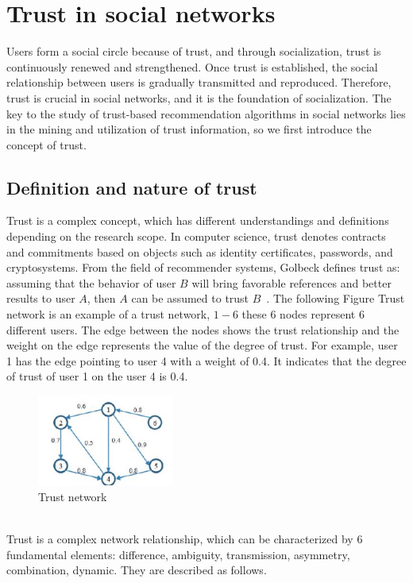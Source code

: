 \section{Trust in social networks}

Users form a social circle because of trust, and through socialization, trust is 
continuously renewed and strengthened. Once trust is established, the social relationship 
between users is gradually transmitted and reproduced\cite{b25, b27}. Therefore, trust is crucial in 
social networks, and it is the foundation of socialization\cite{b28}. The key to the study of 
trust-based recommendation algorithms in social networks lies in the mining and utilization 
of trust information, so we first introduce the concept of trust.

\subsection{Definition and nature of trust}
Trust is a complex concept, which has different understandings and definitions depending 
on the research scope. In computer science, trust denotes contracts and commitments 
based on objects such as identity certificates, passwords, and cryptosystems\cite{b29}. From the 
field of recommender systems, Golbeck defines trust as\cite{b18}: assuming that the behavior of user 
$B$ will bring favorable references and better results to user $A$, then $A$ can be assumed 
to trust $B$~\cite{b26}. The following Figure Trust network is an example 
of a trust network, $1 - 6$ these 6 nodes represent 6 different users. The edge between the nodes shows the 
trust relationship and the weight on the edge represents the value of the degree of trust. 
For example, user 1 has the edge pointing to user 4 with a weight of 0.4. It indicates that the degree of 
trust of user 1 on the user 4 is 0.4\cite{b15}.

\begin{figure}[H] %
    \centering %
    \includegraphics[width=0.4\textwidth]{figures/weight.png} %
    \caption{Trust network} %
    \label{Fig.2: Trust network} %
    \end{figure}
\\
Trust is a complex network relationship, which can be characterized by 6 fundamental elements:
difference, ambiguity, 
transmission, asymmetry, combination, dynamic. They are described as follows\cite{b15, b18}.

